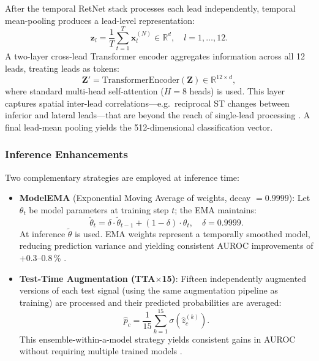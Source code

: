 After the temporal RetNet stack processes each lead independently,
temporal mean-pooling produces a lead-level representation:
\begin{equation}
  \mathbf{z}_l = \frac{1}{T}\sum_{t=1}^{T}\mathbf{x}_l^{(N)}
  \in \mathbb{R}^d, \quad l = 1,\ldots,12.
  \label{eq:temporal_pool}
\end{equation}
A two-layer cross-lead Transformer encoder aggregates information across
all 12 leads, treating leads as tokens:
\begin{equation}
  \mathbf{Z}' = \mathrm{TransformerEncoder}(\mathbf{Z})
  \in \mathbb{R}^{12 \times d},
  \label{eq:lead_fusion}
\end{equation}
where standard multi-head self-attention ($H = 8$ heads) is used.
This layer captures spatial inter-lead correlations---e.g.\ reciprocal
ST changes between inferior and lateral leads---that are beyond the
reach of single-lead processing \cite{ref24,ref31}.
A final lead-mean pooling yields the 512-dimensional classification
vector.

\subsubsection{Inference Enhancements}

Two complementary strategies are employed at inference time:

\begin{itemize}
  \item \textbf{ModelEMA} (Exponential Moving Average of weights,
        decay $= 0.9999$): Let $\theta_t$ be model parameters at
        training step $t$; the EMA maintains:
        \begin{equation}
          \tilde{\theta}_t = \delta \cdot \tilde{\theta}_{t-1}
            + (1 - \delta) \cdot \theta_t,
          \quad \delta = 0.9999.
          \label{eq:ema}
        \end{equation}
        At inference $\tilde{\theta}$ is used.
        EMA weights represent a temporally smoothed model, reducing
        prediction variance and yielding consistent AUROC improvements
        of +0.3--0.8\,\% \cite{ref10}.

  \item \textbf{Test-Time Augmentation (TTA$\times$15)}: Fifteen
        independently augmented versions of each test signal (using
        the same augmentation pipeline as training) are processed and
        their predicted probabilities are averaged:
        \begin{equation}
          \hat{p}_c = \frac{1}{15}\sum_{k=1}^{15}
            \sigma\!\left(\hat{z}_c^{(k)}\right).
          \label{eq:tta}
        \end{equation}
        This ensemble-within-a-model strategy yields consistent gains
        in AUROC without requiring multiple trained models
        \cite{ref7,ref16}.
\end{itemize}

